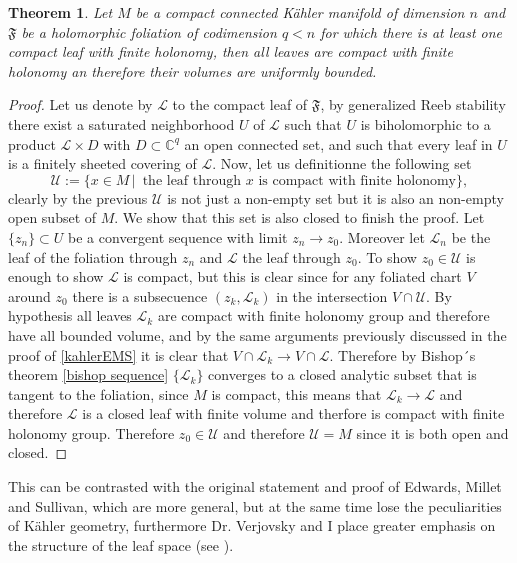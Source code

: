 \documentclass[12pt,twoside,a4paper]{report}
\newtheorem{theorem}{Theorem}[section]
\newcommand{\co}{\ensuremath{\mathbb C }}
\begin{document}
\begin{theorem}\label{compact-leaf}
Let $M$ be a compact connected K\"ahler manifold of dimension $n$ and $\mathfrak{F}$ be a holomorphic foliation of codimension $q<n$ for which there is at least one compact leaf with finite holonomy, then all leaves are compact with finite holonomy an therefore their volumes are uniformly bounded.
\end{theorem}
\begin{proof}
  Let us denote by $\mathcal L$ to the compact leaf of $\mathfrak F$, by generalized Reeb stability there exist a saturated neighborhood $U$ of $\mathcal{L}$ such that $U$ is biholomorphic to a product $\mathcal{L}\times D$ with $D\subset\co^{q}$ an open connected set, and such that every leaf in $U$ is a finitely sheeted covering of $\mathcal{L}$. Now, let us definitionne the following set
\[
    \mathcal{U}:=\{x\in M\,\vert\, \text{ the leaf through $x$ is compact with finite holonomy}\},
\]
clearly by the previous $\mathcal{U}$ is not just a non-empty set but it is also an non-empty open subset of $M$. We show that this set is also closed to finish the proof. Let $\{z_{n}\}\subset U$ be a convergent sequence with limit $z_{n}\rightarrow z_{0}$.
Moreover let $\mathcal{L}_{n}$ be the leaf of the foliation through $z_{n}$ and $\mathcal{L}$ the leaf through $z_{0}$.
To show $z_{0}\in\mathcal{U}$ is enough to show $\mathcal{L}$ is compact, but this is clear since for any foliated chart $V$ around $z_{0}$ there is a subsecuence $(z_{k},\mathcal{L}_{k})$ in the intersection $V\cap\mathcal{U}$.
By hypothesis all leaves $\mathcal{L}_{k}$ are compact with finite holonomy group and therefore have all bounded volume, and by the same arguments previously discussed in the proof of \ref{kahlerEMS} it is clear that $V\cap\mathcal{L}_{k}\rightarrow V\cap\mathcal{L}$.
Therefore by Bishop´s theorem \ref{bishop sequence} $\{\mathcal{L}_{k}\}$ converges to a closed analytic subset that is tangent to the foliation, since $M$ is compact, this means that $\mathcal{L}_{k}\rightarrow\mathcal{L}$ and therefore $\mathcal{L}$ is a closed leaf with finite volume and therfore is compact with finite holonomy group. Therefore $z_{0}\in\mathcal{U}$ and therefore $\mathcal{U}=M$  since it is both open and closed.
\end{proof}


This can be contrasted with the original statement and proof of Edwards, Millet and Sullivan, which are more general, but at the same time lose
the peculiarities of Kähler geometry, furthermore Dr. Verjovsky and I place greater emphasis on the structure of the
leaf space (see \cite{EMS}).
\end{document}
